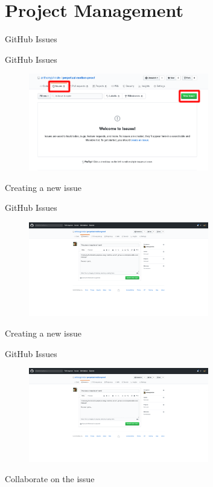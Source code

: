 \documentclass{beamer}
\begin{document}
    \section{Project Management}\label{sec:project-management}
    \begin{frame}{GitHub Issues}

    \end{frame}

    \begin{frame}{GitHub Issues}
        \begin{figure}
            \centering
            \includegraphics[width=0.7\textwidth]{figures/issues_1.png}
        \end{figure}
        \centering
        Creating a new issue
    \end{frame}

    \begin{frame}{GitHub Issues}
        \begin{figure}
            \centering
            \includegraphics[width=0.7\textwidth]{figures/issues_2.png}
        \end{figure}
        \centering
        Creating a new issue
    \end{frame}

    \begin{frame}{GitHub Issues}
        \begin{figure}
            \centering
            \includegraphics[width=0.7\textwidth]{figures/issues_2.png}
        \end{figure}
        \centering
        Collaborate on the issue
    \end{frame}
\end{document}
